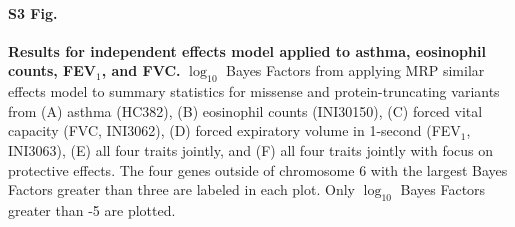 \paragraph*{S3 Fig.}
\label{asthma_similar}
{\bf Results for independent effects model applied to asthma, eosinophil counts, FEV$_1$, and FVC.} $\log_{10}$ Bayes Factors from applying MRP similar effects model to summary statistics for missense and protein-truncating variants from (A) asthma (HC382), (B) eosinophil counts (INI30150), (C) forced vital capacity (FVC, INI3062), (D) forced expiratory volume in 1-second (FEV$_1$, INI3063), (E) all four traits jointly, and (F) all four traits jointly with focus on protective effects. The four genes outside of chromosome 6 with the largest Bayes Factors greater than three are labeled in each plot. Only $\log_{10}$ Bayes Factors greater than -5 are plotted.

% 
% 
% 
% 

